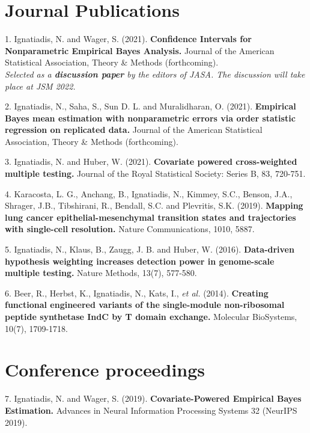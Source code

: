 \documentclass[margin,line]{res}
\newenvironment{list1}{
  \begin{list}{\ding{113}}{%
      \setlength{\itemsep}{0in}
      \setlength{\parsep}{0in} \setlength{\parskip}{0in}
      \setlength{\topsep}{0in} \setlength{\partopsep}{0in}
      \setlength{\leftmargin}{0.17in}}}{\end{list}}
\begin{document}
\begin{resume}
\section{\sc Journal Publications}
\begin{list1}
\item[1.] Ignatiadis, N. and Wager, S. (2021). \textbf{Confidence Intervals for Nonparametric Empirical Bayes Analysis.}  Journal of the American Statistical Association, Theory \& Methods (forthcoming).\\
\emph{Selected as a \textbf{discussion paper} by the editors of JASA. The discussion will take place at JSM 2022.}
\item[2.] Ignatiadis, N., Saha, S., Sun D. L. and Muralidharan, O. (2021). \textbf{Empirical Bayes mean estimation with nonparametric errors via order statistic regression on replicated data.} Journal of the American Statistical Association, Theory \& Methods (forthcoming).
\item[3.] Ignatiadis, N. and Huber, W. (2021). \textbf{Covariate powered cross-weighted multiple testing.} Journal of the Royal Statistical Society: Series B, 83, 720-751.
\item[4.] Karacosta, L. G., Anchang, B., Ignatiadis, N., Kimmey, S.C., Benson, J.A., Shrager, J.B., Tibshirani, R., Bendall, S.C. and Plevritis, S.K. (2019). \textbf{Mapping lung cancer epithelial-mesenchymal transition states and trajectories with single-cell resolution.} Nature Communications, 1010, 5887.
\item[5.]  Ignatiadis, N., Klaus, B., Zaugg, J. B. and Huber, W. (2016). \textbf{Data-driven hypothesis weighting increases detection power in genome-scale multiple testing.} Nature Methods, 13(7), 577-580.
\item[6.] Beer, R., Herbst, K., Ignatiadis, N., Kats, I., \emph{et al.} (2014). \textbf{Creating functional engineered variants of the single-module non-ribosomal peptide synthetase IndC by T domain exchange.} Molecular BioSystems, 10(7), 1709-1718.
\end{list1}
\section{\sc Conference proceedings}
\begin{list1}
\item[7.] Ignatiadis, N. and Wager, S. (2019). \textbf{Covariate-Powered Empirical Bayes Estimation.} Advances in Neural Information Processing Systems 32 (NeurIPS 2019).
\end{list1}

\end{resume}
\end{document}
